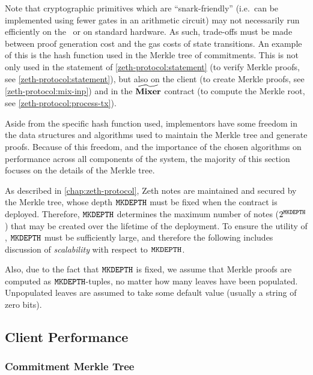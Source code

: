 Note that cryptographic primitives which are ``snark-friendly'' (i.e.~can be implemented using fewer gates in an arithmetic circuit) may not necessarily run efficiently on the \evm~or on standard hardware. As such, trade-offs must be made between proof generation cost and the gas costs of state transitions. An example of this is the hash function used in the Merkle tree of commitments. This is not only used in the statement of \cref{zeth-protocol:statement} (to verify Merkle proofs, see \cref{zeth-protocol:statement}), but also on the client (to create Merkle proofs, see \cref{zeth-protocol:mix-inp}) and in the $\widetilde{\mathbf{Mixer}}$ contract (to compute the Merkle root, see \cref{zeth-protocol:process-tx}).

Aside from the specific hash function used, implementors have some freedom in the data structures and algorithms used to maintain the Merkle tree and generate proofs. Because of this freedom, and the importance of the chosen algorithms on performance across all components of the system, the majority of this section focuses on the details of the Merkle tree.

As described in \cref{chap:zeth-protocol}, Zeth notes are maintained and secured by the Merkle tree, whose depth $\mathtt{MKDEPTH}$ must be fixed when the contract is deployed. Therefore, $\mathtt{MKDEPTH}$ determines the maximum number of notes ($2^{\mathtt{MKDEPTH}}$) that may be created over the lifetime of the deployment. To ensure the utility of \zeth, $\mathtt{MKDEPTH}$ must be sufficiently large, and therefore the following includes discussion of \emph{scalability} with respect to $\mathtt{MKDEPTH}$.

Also, due to the fact that $\mathtt{MKDEPTH}$ is fixed, we assume that Merkle proofs are computed as $\mathtt{MKDEPTH}$-tuples, no matter how many leaves have been populated. Unpopulated leaves are assumed to take some default value (usually a string of zero bits).

\subsection{Client Performance}\label{implementation:efficiency:client-performance}


\subsubsection{Commitment Merkle Tree}

